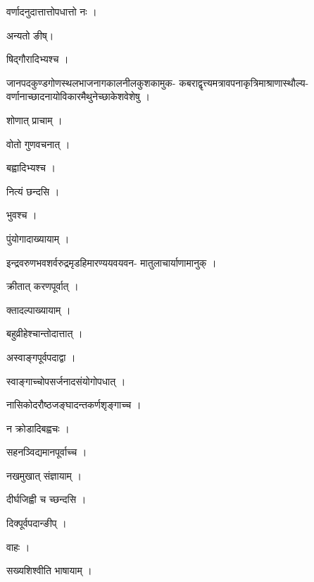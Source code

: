 \documentclass[10pt, openany]{book}
\begin{document}
\noindent वर्णादनुदात्तात्तोपधात्तो नः ।

\noindent अन्यतो ङीष्।

\noindent षिद्गौरादिभ्यश्च ।

\noindent जानपदकुण्डगोणस्थलभाजनागकालनीलकुशकामुक- कबराद्वृत्त्यमत्रावपनाकृत्रिमाश्राणास्थौल्य- वर्णानाच्छादनायोविकारमैथुनेच्छाकेशवेशेषु ।

\noindent शोणात् प्राचाम् ।

\noindent वोतो गुणवचनात् ।

\noindent बह्वादिभ्यश्च ।

\noindent नित्यं छन्दसि ।

\noindent भुवश्च ।

\noindent पुंयोगादाख्यायाम् ।

\noindent इन्द्रवरुणभवशर्वरुद्रमृडहिमारण्ययवयवन- मातुलाचार्याणामानुक् ।

\noindent क्रीतात् करणपूर्वात् ।

\noindent क्तादल्पाख्यायाम् ।

\noindent बहुव्रीहेश्चान्तोदात्तात् ।

\noindent अस्वाङ्गपूर्वपदाद्वा ।

\noindent स्वाङ्गाच्चोपसर्जनादसंयोगोपधात् ।

\noindent नासिकोदरौष्ठजङ्घादन्तकर्णश‍ृङ्गाच्च ।

\noindent न क्रोडादिबह्वचः ।

\noindent सहनञ्विद्यमानपूर्वाच्च ।

\noindent नखमुखात् संज्ञायाम् ।

\noindent दीर्घजिह्वी च च्छन्दसि ।

\noindent दिक्पूर्वपदान्ङीप् ।

\noindent वाहः ।

\noindent सख्यशिश्वीति भाषायाम् ।
\end{document}

